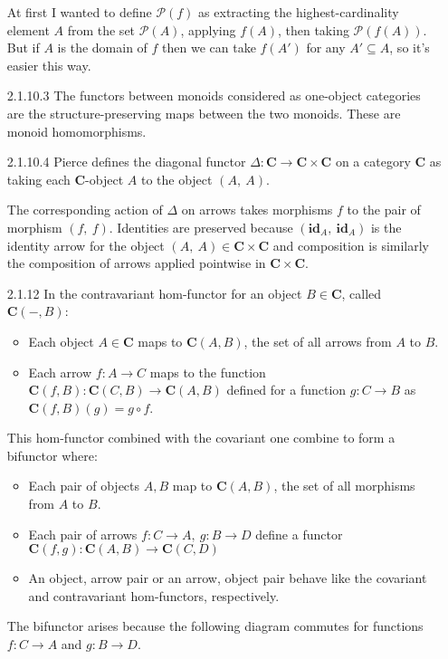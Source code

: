 \documentclass{article}
\newcommand{\diag}{\Delta}
\newcommand{\ccat}{\mathbf{C}}
\newcommand{\id}{\mathbf{id}}
\newcommand{\pow}{\mathcal{P}}
\newcommand{\fpow}{\mathbf{\mathcal{P}}}
\begin{document}
\begin{enumerate}
  At first I wanted to define $\fpow(f)$ as extracting the highest-cardinality element $A$ from the set $\pow(A)$, applying $f(A)$, then taking $\pow(f(A))$.
  But if $A$ is the domain of $f$ then we can take $f(A')$ for any $A' \subseteq A$, so it's easier this way.
\item[]
\item[2.1.10.3] The functors between monoids considered as one-object categories are the structure-preserving maps between the two monoids.
  These are monoid homomorphisms.

\item[]
\item [2.1.10.4]
  Pierce defines the diagonal functor $\diag : \ccat \rightarrow \ccat \times \ccat$ on a category $\ccat$ as taking each $\ccat$-object $A$ to the object $(A,~A)$.
  
  The corresponding action of $\diag$ on arrows takes morphisms $f$ to the pair of morphism $(f,~f)$.
  Identities are preserved because $(\id_A,~\id_A)$ is the identity arrow for the object $(A,~A) \in \ccat \times \ccat$ and composition is similarly the composition of arrows applied pointwise in $\ccat \times \ccat$.

\item[]
\item [2.1.12]
  In the contravariant hom-functor for an object $B \in \ccat$, called $\ccat(-,B)$:
  \begin{itemize}
  \item Each object $A \in \ccat$ maps to $\ccat(A,B)$, the set of all arrows from $A$ to $B$.
  \item Each arrow $f : A \rightarrow C$ maps to the function $\ccat(f, B) : \ccat(C,B) \rightarrow \ccat(A,B)$ defined for a function $g : C \rightarrow B$ as $\ccat(f,B)(g) = g \circ f$.
  \end{itemize}

  This hom-functor combined with the covariant one combine to form a bifunctor where:
  \begin{itemize}
  \item Each pair of objects $A,B$ map to $\ccat(A,B)$, the set of all morphisms from $A$ to $B$.
  \item Each pair of arrows $f : C \rightarrow A,~g : B \rightarrow D$ define a functor $\ccat(f,g) : \ccat(A,B) \rightarrow \ccat(C,D)$
  \item An object, arrow pair or an arrow, object pair behave like the covariant and contravariant hom-functors, respectively.
  \end{itemize}
  The bifunctor arises because the following diagram commutes for functions $f : C \rightarrow A$ and $g : B \rightarrow D$.


\end{enumerate}
\end{document}
